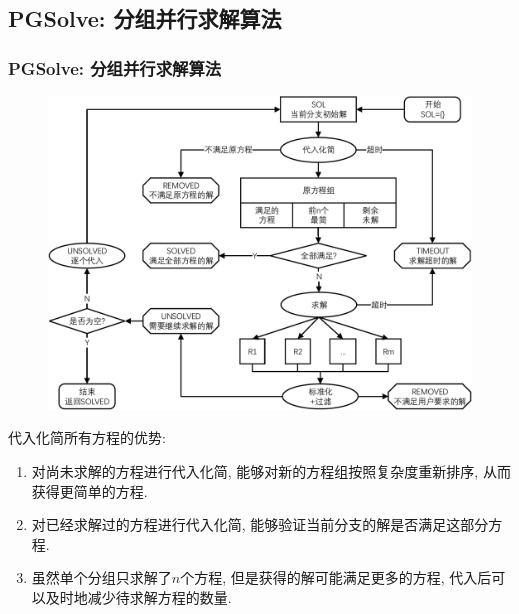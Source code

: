\subsection{PGSolve: 分组并行求解算法}
\begin{frame}
\frametitle{PGSolve: 分组并行求解算法}
\begin{figure}
\centering
\includegraphics[height=0.8\textheight]{../paper/fig/pgsolve.pdf}
\end{figure}
\end{frame}

\begin{frame}
代入化简所有方程的优势:
\begin{enumerate}
\item 对尚未求解的方程进行代入化简, 能够对新的方程组按照复杂度重新排序, 从而获得更简单的方程.
\item 对已经求解过的方程进行代入化简, 能够验证当前分支的解是否满足这部分方程. 
\item 虽然单个分组只求解了$n$个方程, 但是获得的解可能满足更多的方程, 代入后可以及时地减少待求解方程的数量. 
\end{enumerate}
\end{frame}

